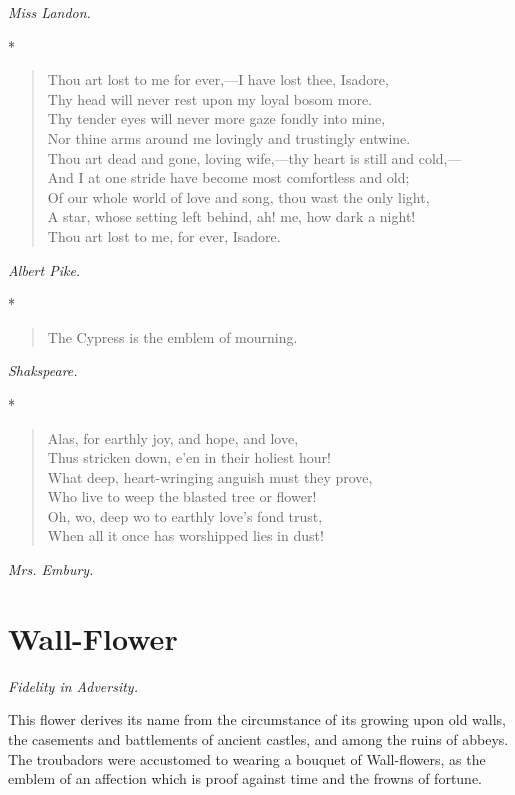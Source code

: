 \documentclass[11pt,twoside]{article}
\newcommand\flower[2]{\section*{#1}\addcontentsline{toc}{section}{#1}%
  \noindent\textit{#2.}\par\medskip}
\newcommand\stars{\begin{center}*\quad*\quad*\end{center}}
\newcommand\by[1]{\par\hfill\textit{#1}\par}
\begin{document}
\by{Miss Landon.}

\stars

\begin{verse}
Thou art lost to me for ever,---I have lost thee, Isadore,\\
Thy head will never rest upon my loyal bosom more.\\
Thy tender eyes will never more gaze fondly into mine,\\
Nor thine arms around me lovingly and trustingly entwine.\\
Thou art dead and gone, loving wife,---thy heart is still and cold,---\\
And I at one stride have become most comfortless and old;\\
Of our whole world of love and song, thou wast the only light,\\
A star, whose setting left behind, ah! me, how dark a night!\\
\quad Thou art lost to me, for ever, Isadore.
\end{verse}

\by{Albert Pike.}

\stars

\begin{verse}
The Cypress is the emblem of mourning.
\end{verse}

\by{Shakspeare.}

\stars

\begin{verse}
Alas, for earthly joy, and hope, and love,\\
\quad Thus stricken down, e’en in their holiest hour!\\
What deep, heart-wringing anguish must they prove,\\
\quad Who live to weep the blasted tree or flower!\\
Oh, wo, deep wo to earthly love’s fond trust,\\
When all it once has worshipped lies in dust!
\end{verse}

\by{Mrs. Embury.}

\flower{Wall-Flower}{Fidelity in Adversity}

This flower derives its name from the circumstance of its growing upon old walls, the casements and battlements of ancient castles, and among the ruins of abbeys. The troubadors were accustomed to wearing a bouquet of Wall-flowers, as the emblem of an affection which is proof against time and the frowns of fortune.
\end{document}
